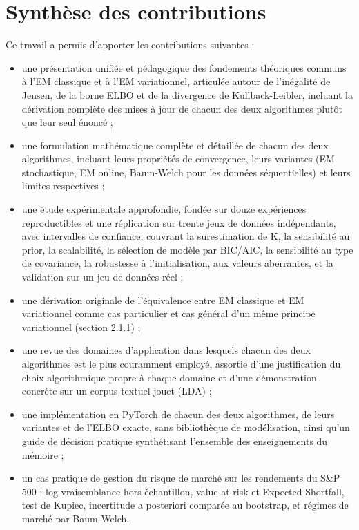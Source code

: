\section*{Synthèse des contributions}
Ce travail a permis d'apporter les contributions suivantes :

\begin{itemize}
\item une présentation unifiée et pédagogique des fondements théoriques communs à l'EM classique et à l'EM variationnel, articulée autour de l'inégalité de Jensen, de la borne ELBO et de la divergence de Kullback-Leibler, incluant la dérivation complète des mises à jour de chacun des deux algorithmes plutôt que leur seul énoncé ;
\item une formulation mathématique complète et détaillée de chacun des deux algorithmes, incluant leurs propriétés de convergence, leurs variantes (EM stochastique, EM online, Baum-Welch pour les données séquentielles) et leurs limites respectives ;
\item une étude expérimentale approfondie, fondée sur douze expériences reproductibles et une réplication sur trente jeux de données indépendants, avec intervalles de confiance, couvrant la surestimation de K, la sensibilité au prior, la scalabilité, la sélection de modèle par BIC/AIC, la sensibilité au type de covariance, la robustesse à l'initialisation, aux valeurs aberrantes, et la validation sur un jeu de données réel ;
\item une dérivation originale de l'équivalence entre EM classique et EM variationnel comme cas particulier et cas général d'un même principe variationnel (section 2.1.1) ;
\item une revue des domaines d'application dans lesquels chacun des deux algorithmes est le plus couramment employé, assortie d'une justification du choix algorithmique propre à chaque domaine et d'une démonstration concrète sur un corpus textuel jouet (LDA) ;
\item une implémentation en PyTorch de chacun des deux algorithmes, de leurs variantes et de l'ELBO exacte, sans bibliothèque de modélisation, ainsi qu'un guide de décision pratique synthétisant l'ensemble des enseignements du mémoire ;
\item un cas pratique de gestion du risque de marché sur les rendements du S\&P 500 : log-vraisemblance hors échantillon, value-at-risk et Expected Shortfall, test de Kupiec, incertitude a posteriori comparée au bootstrap, et régimes de marché par Baum-Welch.
\end{itemize}
